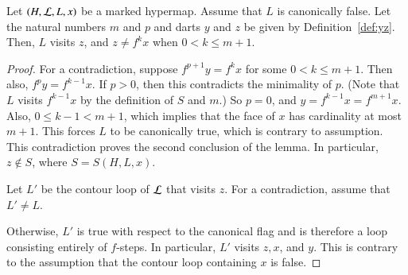 \begin{lemma} \label{lemma:yz}
  Let $(H,{\cal L},L,x)$ be a marked hypermap.  Assume that $L$ is
  canonically false. %
  Let the natural numbers $m$ and $p$ and darts $y$ and $z$ be given by
  Definition~\ref{def:yz}.  Then, $L$ visits $z$, and $z\ne f^k x$
  when $0 < k \le {m+1}$.
\end{lemma}

\begin{proof} 
  For a contradiction, suppose $f^{p+1} y = f^k x$ for some $0<k\le
  m+1$.  Then also, $f^p y = f^{k-1} x$.  If $p>0$, then this
  contradicts the minimality of $p$.  (Note that $L$ visits $f^{k-1}x$
  by the definition of $S$ and $m$.)  So $p=0$, and $y=f^{k-1} x =
  f^{m+1} x$.  Also, $0\le k-1 < {m+1}$, which implies that the face
  of $x$ has cardinality at most $m+1$.  This forces $L$ to be canonically
  true, which is contrary to assumption.  This contradiction proves the second
  conclusion of the lemma.  In particular, $z\not\in S$, where $S =
  S(H,L,x)$.

  Let $L'$ be the contour loop of ${\cal L}$ that visits $z$.  For a
  contradiction, assume that $L'\ne L$.

    Otherwise, $L'$ is true with respect to the
  canonical flag and is therefore a loop consisting entirely of
  $f$-steps.  In particular, $L'$ visits $z,x$, and $y$.  This is
  contrary to the assumption that the contour loop containing $x$ is
  false.


\end{proof}
